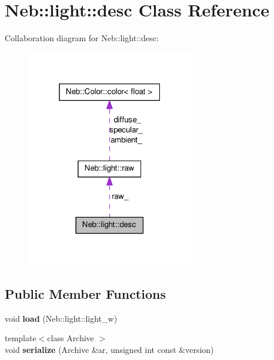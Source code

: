 \hypertarget{classNeb_1_1light_1_1desc}{\section{\-Neb\-:\-:light\-:\-:desc \-Class \-Reference}
\label{classNeb_1_1light_1_1desc}
}


\-Collaboration diagram for \-Neb\-:\-:light\-:\-:desc\-:\nopagebreak
\begin{figure}[H]
\begin{center}
\leavevmode
\includegraphics[width=208pt]{classNeb_1_1light_1_1desc__coll__graph}
\end{center}
\end{figure}
\subsection*{\-Public \-Member \-Functions}
\begin{DoxyCompactItemize}
\item 
\hypertarget{classNeb_1_1light_1_1desc_acc4d2b77cfafb79c73c9157a661027b8}{void {\bfseries load} (\-Neb\-::light\-::light\-\_\-w)}\label{classNeb_1_1light_1_1desc_acc4d2b77cfafb79c73c9157a661027b8}

\item 
\hypertarget{classNeb_1_1light_1_1desc_a4fd70a911dc2b14714989c928103cc4f}{{\footnotesize template$<$class Archive $>$ }\\void {\bfseries serialize} (\-Archive \&ar, unsigned int const \&version)}\label{classNeb_1_1light_1_1desc_a4fd70a911dc2b14714989c928103cc4f}

\end{DoxyCompactItemize}
